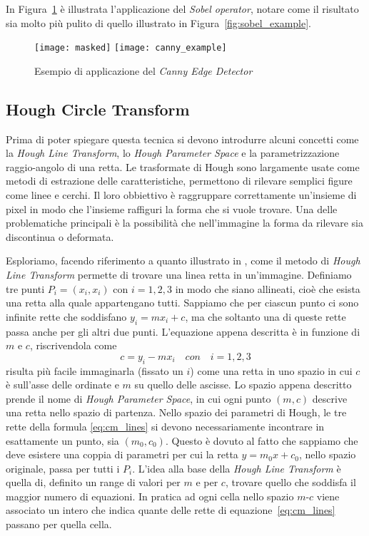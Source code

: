 In Figura~\ref{fig:canny_example} è illustrata l'applicazione del \textit{Sobel operator}, notare come il risultato sia molto più pulito di quello illustrato in Figura~\ref{fig:sobel_example}.
\begin{figure}[ht]
  \begin{center}
    \texttt{[image: masked]}
    \texttt{[image: canny\_example]}
    \caption{Esempio di applicazione del \textit{Canny Edge Detector}}
    \label{fig:canny_example}
  \end{center}
\end{figure}

\subsection {Hough Circle Transform}
Prima di poter spiegare questa tecnica si devono introdurre alcuni concetti come la \textit{Hough Line Transform}, lo \textit{Hough Parameter Space} e la parametrizzazione raggio-angolo di una retta.
Le trasformate di Hough sono largamente usate come metodi di estrazione delle caratteristiche, permettono di rilevare semplici figure come linee e cerchi.
Il loro obbiettivo è raggruppare correttamente un'insieme di pixel in modo che l'insieme raffiguri la forma che si vuole trovare.
Una delle problematiche principali è la possibilità che nell'immagine la forma da rilevare sia discontinua o deformata.

Esploriamo, facendo riferimento a quanto illustrato in \cite{hough-line}, come il metodo di \textit{Hough Line Transform} permette di trovare una linea retta in un'immagine.
Definiamo tre punti $P_i=(x_i, x_i)$ con $i=1,2,3$ in modo che siano allineati, cioè che esista una retta alla quale appartengano tutti.
Sappiamo che per ciascun punto ci sono infinite rette che soddisfano $y_i = m x_i + c$, ma che soltanto una di queste rette passa anche per gli altri due punti.
L'equazione appena descritta è in funzione di $m$ e $c$, riscrivendola come
\begin{equation} \label{eq:cm_lines}
  c = y_i - m x_i \quad con \quad i=1,2,3
\end{equation}
risulta più facile immaginarla (fissato un $i$) come una retta in uno spazio in cui $c$ è sull'asse delle ordinate e $m$ su quello delle ascisse.
Lo spazio appena descritto prende il nome di \textit{Hough Parameter Space}, in cui ogni punto $(m,c)$ descrive una retta nello spazio di partenza.
Nello spazio dei parametri di Hough, le tre rette della formula \ref{eq:cm_lines} si devono necessariamente incontrare in esattamente un punto, sia $(m_0,c_0)$.
Questo è dovuto al fatto che sappiamo che deve esistere una coppia di parametri per cui la retta $y = m_0 x + c_0$, nello spazio originale, passa per tutti i $P_i$.
L'idea alla base della \textit{Hough Line Transform} è quella di, definito un range di valori per $m$ e per $c$, trovare quello che soddisfa il maggior numero di equazioni.
In pratica ad ogni cella nello spazio $m$-$c$ viene associato un intero che indica quante delle rette di equazione~\ref{eq:cm_lines} passano per quella cella.

